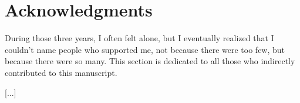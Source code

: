 \chapter*{Acknowledgments}
During those three years, I often felt alone, but I eventually realized that I couldn't name people who supported me, not because there were too few, but because there were so many.
This section is dedicated to all those who indirectly contributed to this manuscript.

[...]